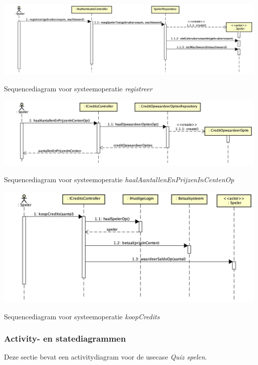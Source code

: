 \begin{mpfigure}
    \includegraphics[width=\linewidth]{../Afbeeldingen/Sequence diagrammen/registreer.png}
    \caption{Sequencediagram voor systeemoperatie \textit{registreer}}
    \label{fig:registreer}
\end{mpfigure}

\begin{mpfigure}
    \includegraphics[width=\linewidth]{../Afbeeldingen/Sequence diagrammen/haalAantallenEnPrijzenInCentenOp.png}
    \caption{Sequencediagram voor systeemoperatie \textit{haalAantallenEnPrijzenInCentenOp}}
    \label{fig:haalaantallenenprijzenincentenop}
\end{mpfigure}

\begin{mpfigure}
    \includegraphics[width=\linewidth]{../Afbeeldingen/Sequence diagrammen/koopCredits.png}
    \caption{Sequencediagram voor systeemoperatie \textit{koopCredits}}
    \label{fig:koopcredits}
\end{mpfigure}

\subsubsection{Activity- en statediagrammen}
Deze sectie bevat een activitydiagram voor de usecase \textit{Quiz spelen}.

